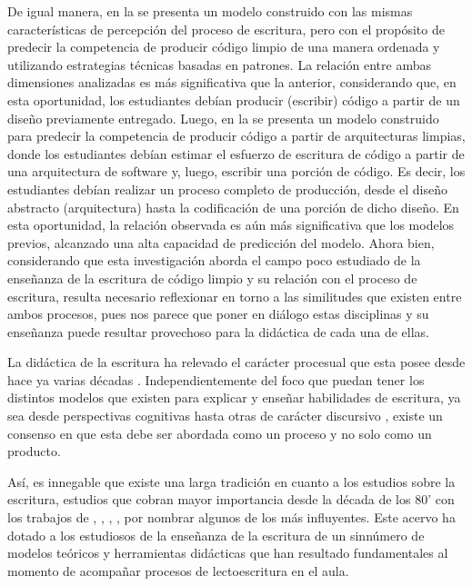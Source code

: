 \documentclass[spanish]{textolivre}
\begin{document}
De igual manera, en la  se presenta un modelo construido con las mismas características de percepción del proceso de escritura, pero con el propósito de predecir la competencia de producir código limpio de una manera ordenada y utilizando estrategias técnicas basadas en patrones. La relación entre ambas dimensiones analizadas es más significativa que la anterior, considerando que, en esta oportunidad, los estudiantes debían producir (escribir) código a partir de un diseño previamente entregado. Luego, en la  se presenta un modelo construido para predecir la competencia de producir código a partir de arquitecturas limpias, donde los estudiantes debían estimar el esfuerzo de escritura de código a partir de una arquitectura de software y, luego, escribir una porción de código. Es decir, los estudiantes debían realizar un proceso completo de producción, desde el diseño abstracto (arquitectura) hasta la codificación de una porción de dicho diseño. En esta oportunidad, la relación observada es aún más significativa que los modelos previos, alcanzado una alta capacidad de predicción del modelo. 
Ahora bien, considerando que esta investigación aborda el campo poco estudiado de la enseñanza de la escritura de código limpio y su relación con el proceso de escritura, resulta necesario reflexionar en torno a las similitudes que existen entre ambos procesos, pues nos parece que poner en diálogo estas disciplinas y su enseñanza puede resultar provechoso para la didáctica de cada una de ellas.  

La didáctica de la escritura ha relevado el carácter procesual que esta posee desde hace ya varias décadas \cite{davoodifard2022overview}. Independientemente del foco que puedan tener los distintos modelos que existen para explicar y enseñar habilidades de escritura, ya sea desde perspectivas cognitivas \cite{flower1996textos} hasta otras de carácter discursivo \cite{bronckart2004actividad}, existe un consenso en que esta debe ser abordada como un proceso y no solo como un producto. 

Así, es innegable que existe una larga tradición en cuanto a los estudios sobre la escritura, estudios que cobran mayor importancia desde la década de los 80’ con los trabajos de \textcite{haves1980identifying}, \textcite{nystrand1982rhetoric}, \textcite{de1984text}, \textcite{bereiter1992modelos}, por nombrar algunos de los más influyentes. Este acervo ha dotado a los estudiosos de la enseñanza de la escritura de un sinnúmero de modelos teóricos y herramientas didácticas que han resultado fundamentales al momento de acompañar procesos de lectoescritura en el aula.
\end{document}
